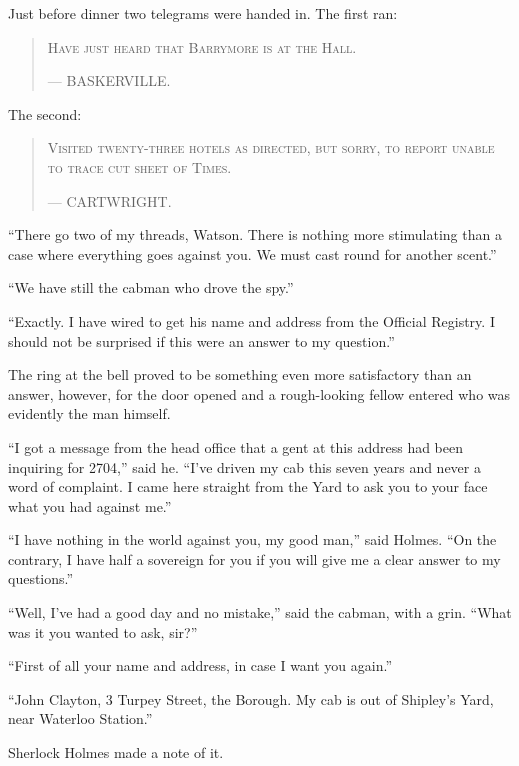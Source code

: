 \documentclass[paper=a5,BCOR=7mm,twoside,DIV=calc,12pt,usegeometry,openany,chapterprefix,endperiod,headings=big]{scrbook} %
\begin{document}
Just before dinner two telegrams were handed in. The first ran:
\begin{samepage}
\blockquote{
\textsc{Have just heard that Barrymore is at the Hall.}
\begin{flushright}
--- {\small\scshape BASKERVILLE.}
\end{flushright} 
}
\end{samepage}

The second:
\begin{samepage}
\blockquote{
\textsc{Visited twenty-three hotels as directed, but sorry, to report unable to trace cut sheet of Times.}
\begin{flushright}
--- {\small\scshape CARTWRIGHT.}
\end{flushright}
}
\end{samepage}

\enquote{There go two of my threads, Watson. There is nothing more stimulating than a case where everything goes against you. We must cast round for another scent.}

\enquote{We have still the cabman who drove the spy.}

\enquote{Exactly. I have wired to get his name and address from the Official Registry. I should not be surprised if this were an answer to my question.}

The ring at the bell proved to be something even more satisfactory than an answer, however, for the door opened and a rough-looking fellow entered who was evidently the man himself.

\enquote{I got a message from the head office that a gent at this address had been inquiring for 2704,} said he. \enquote{I've driven my cab this seven years and never a word of complaint. I came here straight from the Yard to ask you to your face what you had against me.}

\enquote{I have nothing in the world against you, my good man,} said Holmes. \enquote{On the contrary, I have half a sovereign for you if you will give me a clear answer to my questions.}

\enquote{Well, I've had a good day and no mistake,} said the cabman, with a grin. \enquote{What was it you wanted to ask, sir?}

\enquote{First of all your name and address, in case I want you again.}

\enquote{John Clayton, 3 Turpey Street, the Borough. My cab is out of Shipley's Yard, near Waterloo Station.}

Sherlock Holmes made a note of it.
\end{document}
